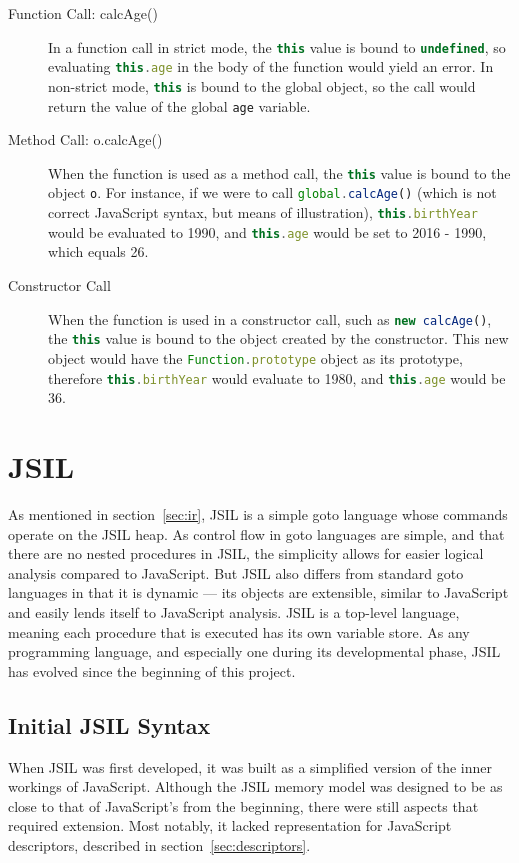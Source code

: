 \documentclass[a4paper,11pt,twoside]{report}
\def\jsinline{\lstinline[language=JavaScript, basicstyle=\small]}%\end{lstlisting}
\begin{document}
\begin{description}
\item[Function Call: calcAge()] In a function call in strict mode, the \jsinline|this| value is bound to \jsinline|undefined|, so evaluating \jsinline|this.age| in the body of the function would yield an error. In non-strict mode, \jsinline|this| is bound to the global object, so the call would return the value of the global \jsinline|age| variable.

\item[Method Call: o.calcAge()] When the function is used as a method call, the \jsinline|this| value is bound to the object \jsinline|o|. For instance, if we were to call \jsinline|global.calcAge()| (which is not correct JavaScript syntax, but means of illustration), \jsinline|this.birthYear| would be evaluated to 1990, and \jsinline|this.age| would be set to 2016 - 1990, which equals 26.

\item[Constructor Call] When the function is used in a constructor call, such as \jsinline|new calcAge()|, the \jsinline|this| value is bound to the object created by the constructor. This new object would have the \jsinline|Function.prototype| object as its prototype, therefore \jsinline|this.birthYear| would evaluate to 1980, and \jsinline|this.age| would be 36.
\end{description}


\chapter{JSIL}\label{sec:jsil}
As mentioned in section~\ref{sec:ir}, JSIL is a simple goto language whose commands operate on the JSIL heap. As control flow in goto languages are simple, and that there are no nested procedures in JSIL, the simplicity allows for easier logical analysis compared to JavaScript. But JSIL also differs from standard goto languages in that it is dynamic --- its objects are extensible, similar to JavaScript and easily lends itself to JavaScript analysis. JSIL is a top-level language, meaning each procedure that is executed has its own variable store. As any programming language, and especially one during its developmental phase, JSIL has evolved since the beginning of this project. 

\section{Initial JSIL Syntax}
When JSIL was first developed, it was built as a simplified version of the inner workings of JavaScript. Although the JSIL memory model was designed to be as close to that of JavaScript's from the beginning, there were still aspects that required extension. Most notably, it lacked representation for JavaScript descriptors, described in section~\ref{sec:descriptors}.
\end{document}
